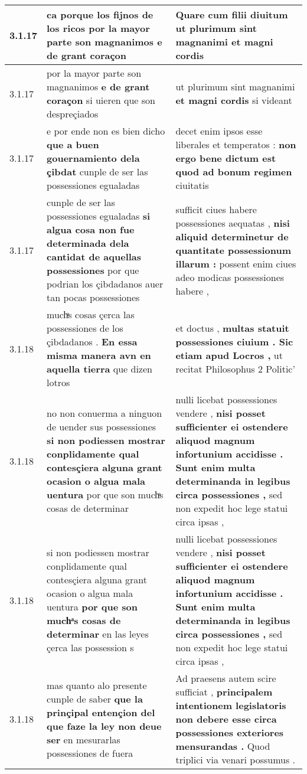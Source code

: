 \begin{tabular}{|p{1cm}|p{6.5cm}|p{6.5cm}|}
3.1.17 & ca porque los fijnos de los ricos \textbf{ por la mayor parte son magnanimos } e de grant coraçon & Quare cum filii diuitum \textbf{ ut plurimum sint magnanimi } et magni cordis \\\hline
3.1.17 & por la mayor parte son magnanimos \textbf{ e de grant coraçon } si uieren que son despreçiados & ut plurimum sint magnanimi \textbf{ et magni cordis } si videant \\\hline
3.1.17 & e por ende non es bien dicho \textbf{ que a buen gouernamiento dela çibdat } cunple de ser las possessiones egualadas & decet enim ipsos esse liberales et temperatos : \textbf{ non ergo bene dictum est quod ad bonum regimen } ciuitatis \\\hline
3.1.17 & cunple de ser las possessiones egualadas \textbf{ si algua cosa non fue determinada dela cantidat de aquellas possessiones } por que podrian los çibdadanos auer tan pocas possessiones & sufficit ciues habere possessiones aequatas , \textbf{ nisi aliquid determinetur de quantitate possessionum illarum : } possent enim ciues adeo modicas possessiones habere , \\\hline
3.1.18 & muchͣs cosas çerca las possessiones de los çibdadanos . \textbf{ En essa misma manera avn en aquella tierra } que dizen lotros & et doctus , \textbf{ multas statuit possessiones ciuium . Sic etiam apud Locros , } ut recitat Philosophus 2 Politic’ \\\hline
3.1.18 & no non conuerma a ninguon de uender sus possessiones \textbf{ si non podiessen mostrar conplidamente qual contesçiera alguna grant ocasion o algua mala uentura } por que son muchͣs cosas de determinar & nulli licebat possessiones vendere , \textbf{ nisi posset sufficienter ei ostendere aliquod magnum infortunium accidisse . Sunt enim multa determinanda in legibus circa possessiones , } sed non expedit hoc lege statui circa ipsas , \\\hline
3.1.18 & si non podiessen mostrar conplidamente qual contesçiera alguna grant ocasion o algua mala uentura \textbf{ por que son muchͣs cosas de determinar } en las leyes çerca las possession s & nulli licebat possessiones vendere , \textbf{ nisi posset sufficienter ei ostendere aliquod magnum infortunium accidisse . Sunt enim multa determinanda in legibus circa possessiones , } sed non expedit hoc lege statui circa ipsas , \\\hline
3.1.18 & mas quanto alo presente cunple de saber \textbf{ que la prinçipal entençion del que faze la ley non deue ser } en mesurarlas possessiones de fuera & Ad praesens autem scire sufficiat , \textbf{ principalem intentionem legislatoris non debere esse circa possessiones exteriores mensurandas . } Quod triplici via venari possumus . \\\hline

\end{tabular}
